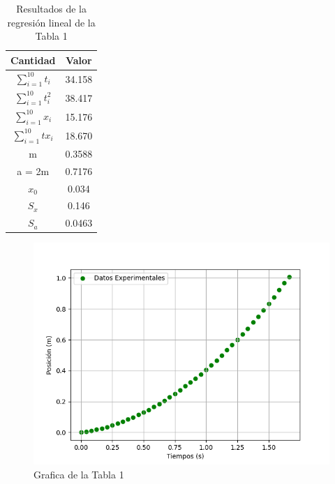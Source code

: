 \documentclass[12pt,a4paper]{article}
\begin{document}
\begin{table}[h!]
\begin{center}
\begin{tabular}{|c|c|}
\hline
Cantidad & Valor \\ \hline
$ \sum^{10}_{i = 1} t_i $ & 34.158 \\ \hline
$\sum^{10}_{i = 1} t_i^2$ & 38.417 \\ \hline
$\sum^{10}_{i = 1} x_i$ & 15.176 \\ \hline
$\sum^{10}_{i = 1} tx_i$ & 18.670 \\ \hline
m & 0.3588 \\ \hline
a = 2m & 0.7176 \\ \hline
$x_0$ & 0.034 \\ \hline
$S_x$ & 0.146 \\ \hline
$S_a$ & 0.0463 \\ \hline

\end{tabular}
\caption{Resultados de la regresión lineal de la Tabla 1}
\end{center}
\end{table}

\begin{figure}[h!]
\centering
\includegraphics[scale=1]{20 g.png}
\caption{Grafica de la Tabla 1}
\end{figure}
\end{document}
